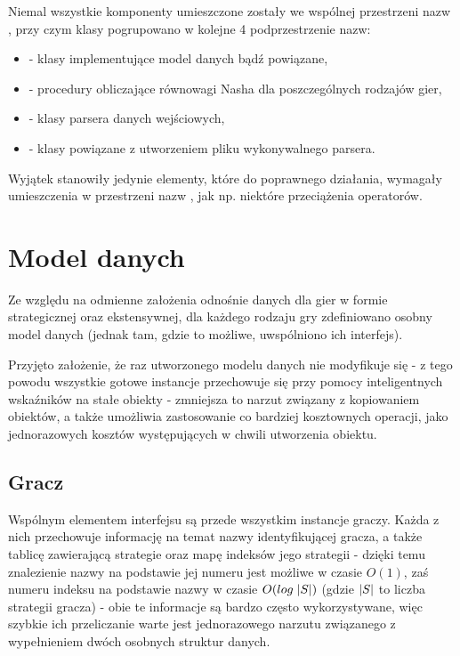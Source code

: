\documentclass[polish]{standalone}
\begin{document}
Niemal wszystkie komponenty umieszczone zostały we wspólnej przestrzeni nazw , przy czym klasy pogrupowano
w kolejne 4 podprzestrzenie nazw:
\begin{itemize}
\item {} - klasy implementujące model danych bądź powiązane,
\item {} - procedury obliczające równowagi Nasha dla poszczególnych rodzajów gier,
\item {} - klasy parsera danych wejściowych,
\item {} - klasy powiązane z utworzeniem pliku wykonywalnego parsera.
\end{itemize}
Wyjątek stanowiły jedynie elementy, które do poprawnego działania, wymagały umieszczenia w przestrzeni nazw ,
jak np. niektóre przeciążenia operatorów.

\section{Model danych}

Ze względu na odmienne założenia odnośnie danych dla gier w formie strategicznej oraz ekstensywnej, dla każdego rodzaju
gry zdefiniowano osobny model danych (jednak tam, gdzie to możliwe, uwspólniono ich interfejs).

Przyjęto założenie, że raz utworzonego modelu danych nie modyfikuje się - z tego powodu wszystkie gotowe instancje
przechowuje się przy pomocy inteligentnych wskaźników na stałe obiekty - zmniejsza to narzut związany z kopiowaniem
obiektów, a także umożliwia zastosowanie co bardziej kosztownych operacji, jako jednorazowych kosztów występujących
w chwili utworzenia obiektu.

\subsection{Gracz}

Wspólnym elementem interfejsu są przede wszystkim instancje graczy. Każda z nich przechowuje informację na temat nazwy
identyfikującej gracza, a także tablicę zawierającą strategie oraz mapę indeksów jego strategii - dzięki temu
znalezienie nazwy na podstawie jej numeru jest możliwe w czasie $O(1)$, zaś numeru indeksu na podstawie nazwy w czasie 
$O(log\;|S|)$ (gdzie $|S|$ to liczba strategii gracza) - obie te informacje są bardzo często wykorzystywane,
więc szybkie ich przeliczanie warte jest jednorazowego narzutu związanego z wypełnieniem dwóch osobnych struktur danych.
\end{document}
